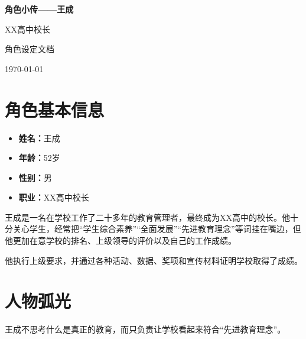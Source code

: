 \documentclass[12pt,a4paper]{ctexart}
\begin{document}
\begin{titlepage}
    \centering
    \vspace*{4cm}

    {\Huge\bfseries 角色小传——王成\par}
    \vspace{2cm}

    {\Large XX高中校长\par}
    \vfill

    {\large 角色设定文档\par}
    \vspace{1cm}

    {\large \today\par}
\end{titlepage}

\tableofcontents
\newpage

\section{角色基本信息}

\begin{itemize}[leftmargin=2em]
    \item \textbf{姓名：}王成
    \item \textbf{年龄：}52岁
    \item \textbf{性别：}男
    \item \textbf{职业：}XX高中校长
\end{itemize}

王成是一名在学校工作了二十多年的教育管理者，最终成为XX高中的校长。他十分关心学生，经常把“学生综合素养”“全面发展”“先进教育理念”等词挂在嘴边，但他更加在意学校的排名、上级领导的评价以及自己的工作成绩。

他执行上级要求，并通过各种活动、数据、奖项和宣传材料证明学校取得了成绩。

\section{人物弧光}

王成不思考什么是真正的教育，而只负责让学校看起来符合“先进教育理念”。
\end{document}
